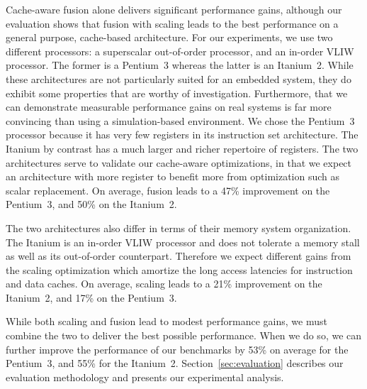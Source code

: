 Cache-aware fusion alone delivers significant performance gains, although our
evaluation shows that fusion with scaling leads to the best
performance on a general purpose, cache-based architecture. For our
experiments, we use two different processors: a superscalar out-of-order
processor, and an in-order VLIW processor. The former is a Pentium~3
whereas the latter is an Itanium~2. While these architectures are not
particularly suited for an embedded system, they do exhibit some
properties that are worthy of investigation. Furthermore, that we can
demonstrate measurable performance gains on real systems is far more
convincing than using a simulation-based environment. We chose the
Pentium~3 processor because it has very few registers in its
instruction set architecture. The Itanium by contrast has a much 
larger and richer repertoire of registers. The two architectures serve
to validate our cache-aware optimizations, in that we expect an
architecture with more register to benefit more from optimization such
as scalar replacement. On average, fusion leads to a 47\% improvement
on the Pentium~3, and 50\% on the Itanium~2.

The two architectures also differ in terms of their memory system
organization. The Itanium is an in-order VLIW processor and does not
tolerate a memory stall as well as its out-of-order
counterpart. Therefore we expect different gains from the scaling
optimization which amortize the long access latencies for instruction
and data caches. On average, scaling leads to a 21\% improvement on
the Itanium~2, and 17\% on the Pentium~3.

While both scaling and fusion lead to modest performance gains, we
must combine the two to deliver the best possible performance. When we
do so, we can further improve the performance of our benchmarks by
53\% on average for the Pentium~3, and 55\% for the Itanium~2.
Section~\ref{sec:evaluation} describes our evaluation
methodology and presents our experimental analysis.

